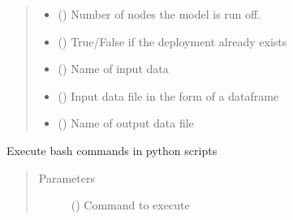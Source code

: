 \documentclass[a4paper,12pt,english]{article}
\begin{document}
\begin{fulllineitems}
\begin{fulllineitems}
\begin{quote}
\begin{description}
\begin{itemize}
\item {} 
 () \textendash{} Number of nodes the model is run off.

\item {} 
 () \textendash{} True/False if the deployment already exists

\item {} 
 () \textendash{} Name of input data

\item {} 
 () \textendash{} Input data file in the form of a dataframe

\item {} 
 () \textendash{} Name of output data file

\end{itemize}

\end{description}\end{quote}

\end{fulllineitems}


\begin{fulllineitems}
\label{\detokenize{GOCPI:GOCPI.Optimisation.Optimisation.use_bash_shell}}
Execute bash commands in python scripts
\begin{quote}\begin{description}
\item[{Parameters}] \leavevmode
{} () \textendash{} Command to execute

\end{description}\end{quote}

\end{fulllineitems}


\end{fulllineitems}
\end{document}
